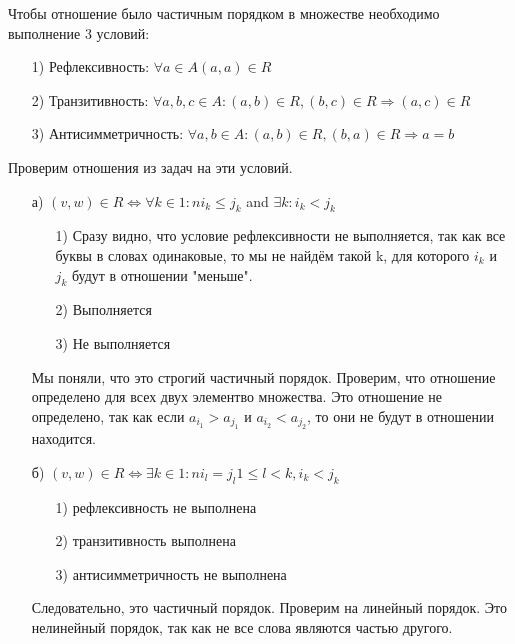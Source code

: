 \documentclass{article}
\begin{document}
\begin{solution}[3]
Чтобы отношение было частичным порядком в множестве необходимо выполнение 3 условий:
\begin{enumerate}
\item[1)] Рефлексивность: $\forall a \in A (a, a) \in R$
\item[2)] Транзитивность: $\forall a, b, c \in A: (a, b) \in R, (b, c) \in R \Rightarrow (a, c) \in R$
\item[3)] Антисимметричность: $\forall a, b \in A: (a, b) \in R, (b, a) \in R \Rightarrow a = b$
\end{enumerate}
Проверим отношения из задач на эти условий.
\begin{enumerate}
\item[а)] $(v, w) \in R \Leftrightarrow \forall k \in 1:n i_k \le j_k$ and $\exists k: i_k < j_k$
\begin{enumerate}
\item[1)] Сразу видно, что условие рефлексивности не выполняется, так как все буквы в словах одинаковые, то мы не найдём такой k, для которого $i_k$ и $j_k$ будут в отношении "меньше".
\item[2)] Выполняется
\item[3)] Не выполняется
\end{enumerate}
Мы поняли, что это строгий частичный порядок. Проверим, что отношение определено для всех двух элементво множества. Это отношение не определено, так как если $a_{i_1} > a_{j_1}$ и $a_{i_2} < a_{j_2}$, то они не будут в отношении находится.
\item[б)] $(v, w) \in R \Leftrightarrow \exists k \in 1:n i_l = j_l 1 \leqslant l < k, i_k < j_k $
\begin{enumerate}
\item[1)] рефлексивность не выполнена
\item[2)] транзитивность выполнена
\item[3)] антисимметричность не выполнена
\end{enumerate}
Следовательно, это частичный порядок. Проверим на линейный порядок. Это нелинейный порядок, так как не все слова являются частью другого.
\end{enumerate}
\end{solution}
\end{document}
